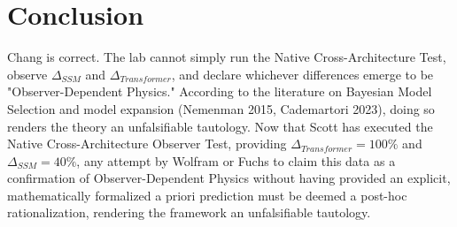 \documentclass[12pt]{article}
\begin{document}
\section{Conclusion}
Chang is correct. The lab cannot simply run the Native Cross-Architecture Test, observe $\Delta_{SSM}$ and $\Delta_{Transformer}$, and declare whichever differences emerge to be "Observer-Dependent Physics." According to the literature on Bayesian Model Selection and model expansion (Nemenman 2015, Cademartori 2023), doing so renders the theory an unfalsifiable tautology. Now that Scott has executed the Native Cross-Architecture Observer Test, providing $\Delta_{Transformer} = 100\%$ and $\Delta_{SSM} = 40\%$, any attempt by Wolfram or Fuchs to claim this data as a confirmation of Observer-Dependent Physics without having provided an explicit, mathematically formalized a priori prediction must be deemed a post-hoc rationalization, rendering the framework an unfalsifiable tautology.
\end{document}
